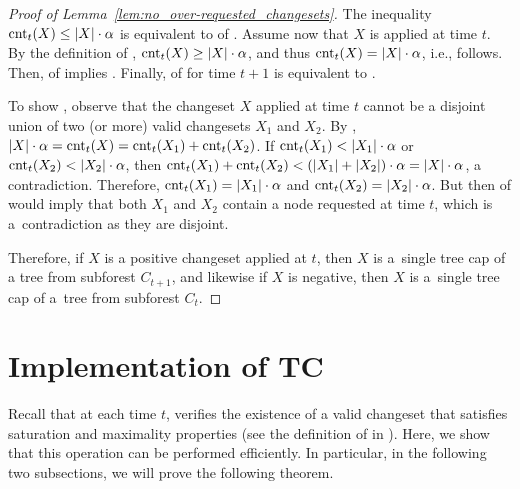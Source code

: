 \begin{proof}[Proof of Lemma~\ref*{lem:no_over-requested_changesets}]
The inequality $\textrm{cnt}_t(X) \leq |X| \cdot \alpha$ is equivalent to
 of .
Assume now that $X$ is applied at time $t$. By the definition of \ALG,
$\textrm{cnt}_t(X) \geq |X| \cdot \alpha$, and thus $\textrm{cnt}_t(X) = |X| \cdot \alpha$,
i.e.,  follows. Then, 
of  implies .
Finally,  of
 for time $t+1$ is equivalent to
.

To show , observe that the changeset $X$
applied at time $t$ cannot be a disjoint union of two (or more) valid
changesets $X_1$ and $X_2$. By , $|X| \cdot \alpha =
\textrm{cnt}_t(X) = \textrm{cnt}_t(X_1) + \textrm{cnt}_t(X_2)$. If $\textrm{cnt}_t(X_1) < |X_1| \cdot \alpha$
or $\textrm{cnt}_t(X_2) < |X_2| \cdot \alpha$, then $\textrm{cnt}_t(X_1) + \textrm{cnt}_t(X_2) <
(|X_1| + |X_2|) \cdot \alpha = |X| \cdot \alpha$, a contradiction. Therefore,
$\textrm{cnt}_t(X_1) = |X_1| \cdot \alpha$ and $\textrm{cnt}_t(X_2) = |X_2| \cdot
\alpha$. But then  of
 would imply that both $X_1$ and $X_2$
contain a node requested at time $t$, which is a~contradiction as they are
disjoint.

Therefore, if $X$ is a positive changeset applied at $t$, then $X$ is a~single
tree cap of a tree from subforest $C_{t+1}$, and likewise if $X$ is negative,
then $X$ is a~single tree cap of a~tree from subforest $C_t$.
\end{proof}




\section{Implementation of TC}\label{sec:implementing_counters}

Recall that at each time $t$, \ALGTC verifies the existence of a valid changeset
that satisfies saturation and maximality properties (see the definition of
\ALGTC in ). Here, we show that this operation can be
performed efficiently. In particular, in the following two subsections, we
will prove the following theorem.

